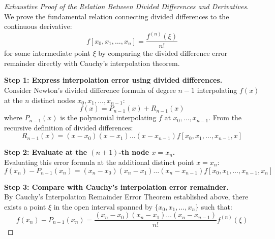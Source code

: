 \begin{proof}[Exhaustive Proof of the Relation Between Divided Differences and Derivatives]
We prove the fundamental relation connecting divided differences to the continuous derivative:
\begin{equation}
    f[x_0, x_1, \dots, x_n] = \frac{f^{(n)}(\xi)}{n!}
\end{equation}
for some intermediate point $\xi$ by comparing the divided difference error remainder directly with Cauchy's interpolation theorem.

\medskip
\noindent\textbf{Step 1: Express interpolation error using divided differences.} \\
Consider Newton's divided difference formula of degree $n - 1$ interpolating $f(x)$ at the $n$ distinct nodes $x_0, x_1, \dots, x_{n-1}$:
\begin{equation}
    f(x) = P_{n-1}(x) + R_{n-1}(x)
\end{equation}
where $P_{n-1}(x)$ is the polynomial interpolating $f$ at $x_0, \dots, x_{n-1}$.
From the recursive definition of divided differences:
\begin{equation}
    R_{n-1}(x) = (x - x_0)(x - x_1)\dots(x - x_{n-1}) f[x_0, x_1, \dots, x_{n-1}, x]
\end{equation}

\noindent\textbf{Step 2: Evaluate at the $(n+1)$-th node $x = x_n$.} \\
Evaluating this error formula at the additional distinct point $x = x_n$:
\begin{equation}
    \label{eq:dd_remainder_at_xn}
    f(x_n) - P_{n-1}(x_n) = (x_n - x_0)(x_n - x_1)\dots(x_n - x_{n-1}) f[x_0, x_1, \dots, x_{n-1}, x_n]
\end{equation}

\noindent\textbf{Step 3: Compare with Cauchy's interpolation error remainder.} \\
By Cauchy's Interpolation Remainder Error Theorem established above, there exists a point $\xi$ in the open interval spanned by $\{x_0, x_1, \dots, x_n\}$ such that:
\begin{equation}
    \label{eq:cauchy_at_xn}
    f(x_n) - P_{n-1}(x_n) = \frac{(x_n - x_0)(x_n - x_1)\dots(x_n - x_{n-1})}{n!} f^{(n)}(\xi)
\end{equation}


\end{proof}
